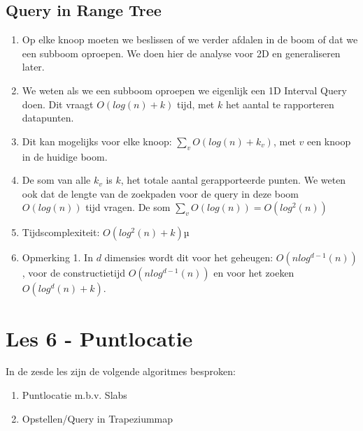 \documentclass[12pt,a4paper]{article}
\begin{document}
		\subsection{Query in Range Tree}
		\begin{enumerate}
			\item Op elke knoop moeten we beslissen of we verder afdalen in de boom of dat we een subboom oproepen. We doen hier de analyse voor 2D en generaliseren later.
			\item We weten als we een subboom oproepen we eigenlijk een 1D Interval Query doen. Dit vraagt $O(log (n) + k)$ tijd, met $k$ het aantal te rapporteren datapunten.
			\item Dit kan mogelijks voor elke knoop: $\sum_{v}O(log (n) + k_v)$, met $v$ een knoop in de huidige boom. 
			\item De som van alle $k_v$ is $k$, het totale aantal gerapporteerde punten. We weten ook dat de lengte van de zoekpaden voor de query in deze boom $O(log (n))$ tijd vragen. De som $\sum_{v}O(log (n)) = O(log^2 (n))$
			\item Tijdscomplexiteit: $O(log^2 (n) + k)$µ
			\item Opmerking 1. In $d$ dimensies wordt dit voor het geheugen: $O(n log^{d-1} (n))$, voor de constructietijd $O(n log^{d-1} (n))$ en voor het zoeken $O(log^{d} (n) + k)$. 
		\end{enumerate}
	
	\section{Les 6 - Puntlocatie}
		In de zesde les zijn de volgende algoritmes besproken:
		\begin{enumerate}
			\item Puntlocatie m.b.v. Slabs
			\item Opstellen/Query in Trapeziummap
		\end{enumerate}
	
\end{document}
